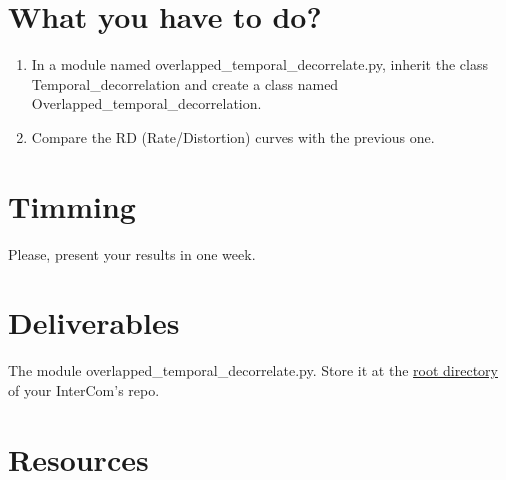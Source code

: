 \section{What you have to do?}

\begin{enumerate}
\item In a module named overlapped\_temporal\_decorrelate.py, inherit
  the class Temporal\_decorrelation and create a class named
  Overlapped\_temporal\_decorrelation.
\item Compare the RD (Rate/Distortion) curves with the previous one.
\end{enumerate}

\section{Timming}

Please, present your results in one week.

\section{Deliverables}

The module overlapped\_temporal\_decorrelate.py. Store it at the
\href{https://github.com/Tecnologias-multimedia/intercom}{root
  directory} of your InterCom's repo.

\section{Resources}


